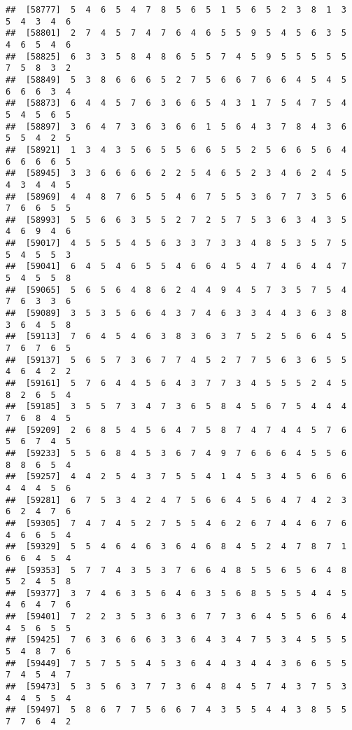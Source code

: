 \documentclass[
]{book}
\begin{document}
\begin{verbatim}
##  [58777]  5  4  6  5  4  7  8  5  6  5  1  5  6  5  2  3  8  1  3  5  4  3  4  6
##  [58801]  2  7  4  5  7  4  7  6  4  6  5  5  9  5  4  5  6  3  5  4  6  5  4  6
##  [58825]  6  3  3  5  8  4  8  6  5  5  7  4  5  9  5  5  5  5  5  7  5  8  3  2
##  [58849]  5  3  8  6  6  6  5  2  7  5  6  6  7  6  6  4  5  4  5  6  6  6  3  4
##  [58873]  6  4  4  5  7  6  3  6  6  5  4  3  1  7  5  4  7  5  4  5  4  5  6  5
##  [58897]  3  6  4  7  3  6  3  6  6  1  5  6  4  3  7  8  4  3  6  5  5  4  2  5
##  [58921]  1  3  4  3  5  6  5  5  6  6  5  5  2  5  6  6  5  6  4  6  6  6  6  5
##  [58945]  3  3  6  6  6  6  2  2  5  4  6  5  2  3  4  6  2  4  5  4  3  4  4  5
##  [58969]  4  4  8  7  6  5  5  4  6  7  5  5  3  6  7  7  3  5  6  7  6  6  5  5
##  [58993]  5  5  6  6  3  5  5  2  7  2  5  7  5  3  6  3  4  3  5  4  6  9  4  6
##  [59017]  4  5  5  5  4  5  6  3  3  7  3  3  4  8  5  3  5  7  5  5  4  5  5  3
##  [59041]  6  4  5  4  6  5  5  4  6  6  4  5  4  7  4  6  4  4  7  5  4  5  5  8
##  [59065]  5  6  5  6  4  8  6  2  4  4  9  4  5  7  3  5  7  5  4  7  6  3  3  6
##  [59089]  3  5  3  5  6  6  4  3  7  4  6  3  3  4  4  3  6  3  8  3  6  4  5  8
##  [59113]  7  6  4  5  4  6  3  8  3  6  3  7  5  2  5  6  6  4  5  7  6  7  6  5
##  [59137]  5  6  5  7  3  6  7  7  4  5  2  7  7  5  6  3  6  5  5  4  6  4  2  2
##  [59161]  5  7  6  4  4  5  6  4  3  7  7  3  4  5  5  5  2  4  5  8  2  6  5  4
##  [59185]  3  5  5  7  3  4  7  3  6  5  8  4  5  6  7  5  4  4  4  7  6  8  4  5
##  [59209]  2  6  8  5  4  5  6  4  7  5  8  7  4  7  4  4  5  7  6  5  6  7  4  5
##  [59233]  5  5  6  8  4  5  3  6  7  4  9  7  6  6  6  4  5  5  6  8  8  6  5  4
##  [59257]  4  4  2  5  4  3  7  5  5  4  1  4  5  3  4  5  6  6  6  4  4  4  5  6
##  [59281]  6  7  5  3  4  2  4  7  5  6  6  4  5  6  4  7  4  2  3  6  2  4  7  6
##  [59305]  7  4  7  4  5  2  7  5  5  4  6  2  6  7  4  4  6  7  6  4  6  6  5  4
##  [59329]  5  5  4  6  4  6  3  6  4  6  8  4  5  2  4  7  8  7  1  6  6  4  5  4
##  [59353]  5  7  7  4  3  5  3  7  6  6  4  8  5  5  6  5  6  4  8  5  2  4  5  8
##  [59377]  3  7  4  6  3  5  6  4  6  3  5  6  8  5  5  5  4  4  5  4  6  4  7  6
##  [59401]  7  2  2  3  5  3  6  3  6  7  7  3  6  4  5  5  6  6  4  4  5  6  5  5
##  [59425]  7  6  3  6  6  6  3  3  6  4  3  4  7  5  3  4  5  5  5  5  4  8  7  6
##  [59449]  7  5  7  5  5  4  5  3  6  4  4  3  4  4  3  6  6  5  5  7  4  5  4  7
##  [59473]  5  3  5  6  3  7  7  3  6  4  8  4  5  7  4  3  7  5  3  4  4  5  5  4
##  [59497]  5  8  6  7  7  5  6  6  7  4  3  5  5  4  4  3  8  5  5  7  7  6  4  2

\end{verbatim}
\end{document}
